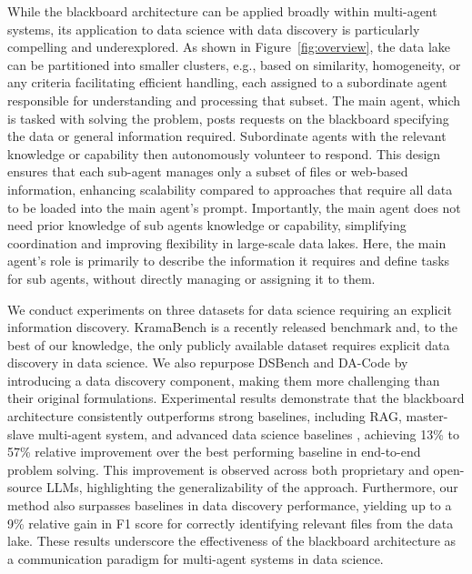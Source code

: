 While the blackboard architecture can be applied broadly within multi-agent systems, its application to data science with data discovery is particularly compelling and underexplored. As shown in Figure~\ref{fig:overview}, the data lake can be partitioned into smaller clusters, e.g., based on similarity, homogeneity, or any criteria facilitating efficient handling, each assigned to a subordinate agent responsible for understanding and processing that subset. The main agent, which is tasked with solving the problem, posts requests on the blackboard specifying the data or general information required. Subordinate agents with the relevant knowledge or capability then autonomously volunteer to respond. This design ensures that each sub-agent manages only a subset of files or web-based information, enhancing scalability compared to approaches that require all data to be loaded into the main agent's prompt. Importantly, the main agent does not need prior knowledge of sub agents knowledge or capability, simplifying coordination and improving flexibility in large-scale data lakes. Here, the main agent's role is primarily to describe the information it requires and define tasks for sub agents, without directly managing or assigning it to them.



We conduct experiments on three datasets for data science requiring an explicit information discovery. KramaBench \citep{lai2025kramabenchbenchmarkaisystems} is a recently released benchmark and, to the best of our knowledge, the only publicly available dataset requires explicit data discovery in data science. We also repurpose DSBench \citep{jing2025dsbench} and DA-Code \citep{huang-etal-2024-da} by introducing a data discovery component, making them more challenging than their original formulations. Experimental results demonstrate that the blackboard architecture consistently outperforms strong baselines, including RAG, master-slave multi-agent system, and advanced data science baselines \citep{hong-etal-2025-data, wu2023autogenenablingnextgenllm}, achieving 13\% to 57\% relative improvement over the best performing baseline in end-to-end problem solving. This improvement is observed across both proprietary and open-source LLMs, highlighting the generalizability of the approach. Furthermore, our method also surpasses baselines in data discovery performance, yielding up to a 9\% relative gain in F1 score for correctly identifying relevant files from the data lake. These results underscore the effectiveness of the blackboard architecture as a communication paradigm for multi-agent systems in data science.

